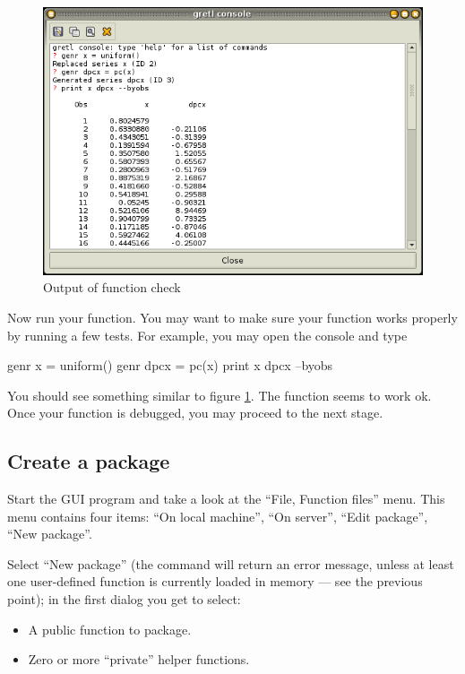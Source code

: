 \begin{figure}[htbp]
  \centering
  \includegraphics[scale=0.5]{figures/func_check}
  \caption{Output of function check}
  \label{fig:func_check}
\end{figure}

Now run your function. You may want to make sure your function works
properly by running a few tests. For example, you may open the console
and type

\begin{code}
genr x = uniform()
genr dpcx = pc(x)
print x dpcx --byobs
\end{code}

You should see something similar to figure \ref{fig:func_check}. The
function seems to work ok. Once your function is debugged, you
may proceed to the next stage.

\subsection{Create a package}

Start the GUI program and take a look at the ``File, Function files'' menu.
This menu contains four items: ``On local machine'', ``On server'', ``Edit
package'', ``New package''.

Select ``New package'' (the command will return an error message,
unless at least one user-defined function is currently loaded in
memory --- see the previous point); in the first dialog you get to
select:

\begin{itemize}
\item A public function to package.
\item Zero or more ``private'' helper functions.
\end{itemize}

